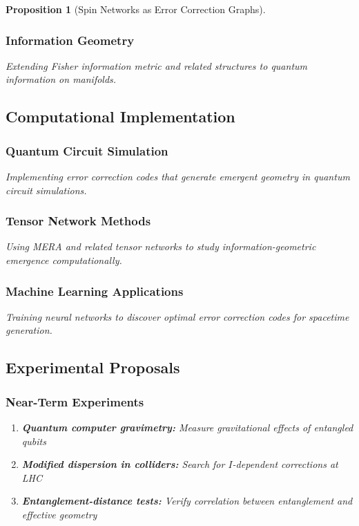\documentclass[12pt,a4paper]{article}
\newtheorem{proposition}[theorem]{Proposition}
\theoremstyle{remark}
\begin{document}
\begin{proposition}[Spin Networks as Error Correction Graphs]
\subsubsection{Information Geometry}

Extending Fisher information metric and related structures to quantum information on manifolds.

\subsection{Computational Implementation}

\subsubsection{Quantum Circuit Simulation}

Implementing error correction codes that generate emergent geometry in quantum circuit simulations.

\subsubsection{Tensor Network Methods}

Using MERA and related tensor networks to study information-geometric emergence computationally.

\subsubsection{Machine Learning Applications}

Training neural networks to discover optimal error correction codes for spacetime generation.

\subsection{Experimental Proposals}

\subsubsection{Near-Term Experiments}

\begin{enumerate}
\item \textbf{Quantum computer gravimetry:} Measure gravitational effects of entangled qubits
\item \textbf{Modified dispersion in colliders:} Search for $I$-dependent corrections at LHC
\item \textbf{Entanglement-distance tests:} Verify correlation between entanglement and effective geometry
\end{enumerate}


\end{proposition}
\end{document}
